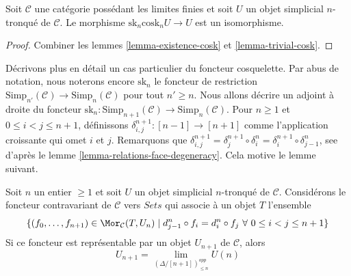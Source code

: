 \begin{lemma}
\label{lemma-recover-cosk}
Soit $\mathcal{C}$ une catégorie possédant les limites finies et soit
$U$ un objet simplicial $n$-tronqué de $\mathcal{C}$. Le morphisme
$\text{sk}_n \text{cosk}_n U \to U$ est un isomorphisme.
\end{lemma}

\begin{proof}
Combiner les lemmes \ref{lemma-existence-cosk} et
\ref{lemma-trivial-cosk}.
\end{proof}

\noindent
Décrivons plus en détail un cas particulier du foncteur cosquelette.
Par abus de notation, nous noterons encore $\text{sk}_n$ le foncteur de
restriction
$\text{Simp}_{n'}(\mathcal{C}) \to \text{Simp}_n(\mathcal{C})$
pour tout $n' \geq n$. Nous allons décrire un adjoint à droite du foncteur
$\text{sk}_n : \text{Simp}_{n + 1}(\mathcal{C})
\to \text{Simp}_n(\mathcal{C})$.
Pour $n \geq 1$ et $0 \leq i < j \leq n + 1$, définissons
$\delta^{n + 1}_{i, j} : [n - 1] \to [n + 1]$ comme l'application
croissante qui omet $i$ et $j$. Remarquons que
$\delta^{n + 1}_{i, j} =
\delta^{n + 1}_j \circ \delta^n_i =
\delta^{n + 1}_i \circ \delta^n_{j - 1}$, see
d'après le lemme \ref{lemma-relations-face-degeneracy}. Cela motive le
lemme suivant.

\begin{lemma}
\label{lemma-formula-limit}
Soit $n$ un entier $\geq 1$ et soit $U$ un objet simplicial $n$-tronqué
de $\mathcal{C}$. Considérons le foncteur contravariant de $\mathcal{C}$
vers $\textit{Sets}$ qui associe à un objet $T$ l'ensemble
$$
\{ (f_0, \ldots, f_{n + 1}) \in \Mor_\mathcal{C}(T, U_n)
\mid
d^n_{j - 1} \circ f_i = d^n_i \circ f_j
\ \forall\ 0\leq i < j\leq n + 1\}
$$
Si ce foncteur est représentable par un objet $U_{n + 1}$ de
$\mathcal{C}$, alors
$$
U_{n + 1} = \lim_{(\Delta/[n + 1])_{\leq n}^{opp}} U(n)
$$
\end{lemma}

